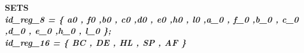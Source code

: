 \documentclass[a4paper]{llncs}
\begin{document}
\begin{sloppypar}

	\bf SETS\\
	\hspace*{0.10in}\it id\_reg\_8 \rm = \rm \{ \it a0 \rm , \it f0 \rm ,\it b0 \rm , \it c0 \rm ,\it d0 \rm , \it e0 \rm ,\it h0 \rm , \it l0 \rm ,\it a\_0 \rm , \it f\_0 \rm ,\it b\_0 \rm , \it c\_0 \rm ,\it d\_0 \rm , \it e\_0 \rm ,\it h\_0 \rm , \it l\_0 \rm \};\\
	\hspace*{0.10in}\it id\_reg\_16 \rm = \rm \{ \it BC \rm , \it DE \rm , \it HL \rm , \it SP \rm , \it AF \rm \}
	

\end{sloppypar}

%
\end{document}
